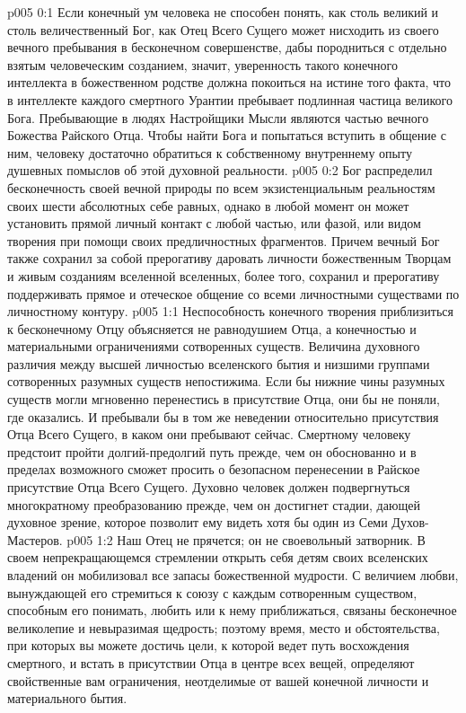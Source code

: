 \vs p005 0:1 Если конечный ум человека не способен понять, как столь великий и столь величественный Бог, как Отец Всего Сущего может нисходить из своего вечного пребывания в бесконечном совершенстве, дабы породниться с отдельно взятым человеческим созданием, значит, уверенность такого конечного интеллекта в божественном родстве должна покоиться на истине того факта, что в интеллекте каждого смертного Урантии пребывает подлинная частица великого Бога. Пребывающие в людях Настройщики Мысли являются частью вечного Божества Райского Отца. Чтобы найти Бога и попытаться вступить в общение с ним, человеку достаточно обратиться к собственному внутреннему опыту душевных помыслов об этой духовной реальности.
\vs p005 0:2 Бог распределил бесконечность своей вечной природы по всем экзистенциальным реальностям своих шести абсолютных себе равных, однако в любой момент он может установить прямой личный контакт с любой частью, или фазой, или видом творения при помощи своих предличностных фрагментов. Причем вечный Бог также сохранил за собой прерогативу даровать личности божественным Творцам и живым созданиям вселенной вселенных, более того, сохранил и прерогативу поддерживать прямое и отеческое общение со всеми личностными существами по личностному контуру.
\vs p005 1:1 Неспособность конечного творения приблизиться к бесконечному Отцу объясняется не равнодушием Отца, а конечностью и материальными ограничениями сотворенных существ. Величина духовного различия между высшей личностью вселенского бытия и низшими группами сотворенных разумных существ непостижима. Если бы нижние чины разумных существ могли мгновенно перенестись в присутствие Отца, они бы не поняли, где оказались. И пребывали бы в том же неведении относительно присутствия Отца Всего Сущего, в каком они пребывают сейчас. Смертному человеку предстоит пройти долгий\hyp{}предолгий путь прежде, чем он обоснованно и в пределах возможного сможет просить о безопасном перенесении в Райское присутствие Отца Всего Сущего. Духовно человек должен подвергнуться многократному преобразованию прежде, чем он достигнет стадии, дающей духовное зрение, которое позволит ему видеть хотя бы один из Семи Духов\hyp{}Мастеров.
\vs p005 1:2 Наш Отец не прячется; он не своевольный затворник. В своем непрекращающемся стремлении открыть себя детям своих вселенских владений он мобилизовал все запасы божественной мудрости. С величием любви, вынуждающей его стремиться к союзу с каждым сотворенным существом, способным его понимать, любить или к нему приближаться, связаны бесконечное великолепие и невыразимая щедрость; поэтому время, место и обстоятельства, при которых вы можете достичь цели, к которой ведет путь восхождения смертного, и встать в присутствии Отца в центре всех вещей, определяют свойственные вам ограничения, неотделимые от вашей конечной личности и материального бытия.
